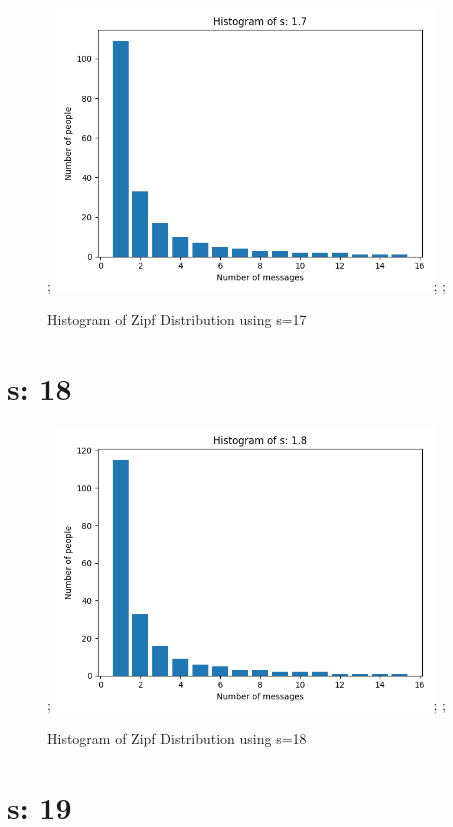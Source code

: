 \documentclass{article}
\begin{document}
\begin{figure}[H] \centering; \includegraphics[width=10cm]{imgs/histogram-17.png}; \label{fig:hist-17}; \caption{Histogram of Zipf Distribution using s=17} \end{figure}


\section{s: 18}

\begin{figure}[H] \centering; \includegraphics[width=10cm]{imgs/histogram-18.png}; \label{fig:hist-18}; \caption{Histogram of Zipf Distribution using s=18} \end{figure}


\section{s: 19}
\end{document}

